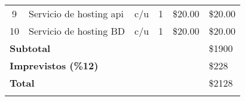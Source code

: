 \begin{ThreePartTable}
\begin{longtable}{ |c p{}| c| c |p{} |p{}|}
		9                                                 & Servicio de hosting api   & c/u             & 1                 & \$20.00                 & \$20.00              \\
		10                                                & Servicio de hosting BD    & c/u             & 1                 & \$20.00                 & \$20.00              \\
		\midrule
		\multicolumn{5}{|l|}{\textbf{Subtotal}}           & \$1900                                                                                                           \\
		\multicolumn{5}{|l|}{\textbf{Imprevistos (\%12)}} & \$228                                                                                                            \\
		\multicolumn{5}{|l|}{\textbf{Total}}              & \$2128                                                                                                           \\
		\bottomrule
		\insertTableNotes
	\end{longtable}
\end{ThreePartTable}

